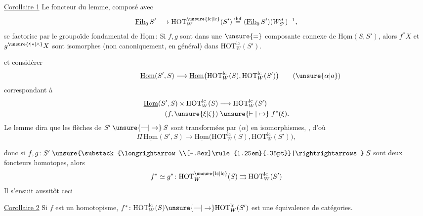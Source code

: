 \uline{Corollaire 1} Le foncteur du lemme, composé avec
\[
\underline{\mathrm{Fib}}_0\,S'\longrightarrow\mathrm{HOT}_W^{\unsure{\mathrm{lc}|\mathrm{le}}}(S')
\overset{\mathrm{def}}{=}(\underline{\mathrm{Fib}}_0\,S')(W_{S'}^d)^{-1},
\]
se factorise par le groupoïde fondamental de $\underline{\mathrm{Hom}}$\,:
Si $f,g$ sont dans une $\unsure{=}$ composante connexe de $\underline{\mathrm{Hom}}(S,S')$, alors $f^*X$ et $g^{\unsure{\prime|*|\wedge}}X$ sont isomorphes  (non canoniquement, en général) dans $\mathrm{HOT}_W^{\mathrm{lc}}(S')$.

  et  considérer
\[
\underline{\mathrm{Hom}}(S',S)\longrightarrow\underline{\mathrm{Hom}}\bigl(\mathrm{HOT}_W^{\mathrm{lc}}(S),\mathrm{HOT}_W^{\mathrm{lc}}(S')\bigr)\tag*{\makebox[0pt][r]{\makebox[\displaywidth][l]{($\unsure{\alpha|a}$)}}}
\]
correspondant à
\[
\begin{aligned}
\underline{\mathrm{Hom}}(S',S)\times\mathrm{HOT}_W^{\mathrm{lc}}(S)&\longrightarrow\mathrm{HOT}_W^{\mathrm{lc}}(S')\\
(f,\unsure{\xi|\zeta})&\mathrel{\unsure{\vdash|\mapsto}}f^*(\xi).
\end{aligned}
\]
Le lemme dira que les flèches de $S'\mathbin{\unsure{\text{---}|\to}}S$ sont transformées par ($\alpha$) en isomorphismes, , d'où
\[
\Pi\,\underline{\mathrm{Hom}}(S',S)\longrightarrow\underline{\mathrm{Hom}}\bigl(\mathrm{HOT}_W^{\mathrm{lc}}(S),\mathrm{HOT}_W^{\mathrm{lc}}(S')\bigr),
\]


donc si $f,g\colon S'\mathrel{\unsure{\substack{\longrightarrow\\[-.8ex]\rule{1.25em}{.35pt}}|\rightrightarrows}}S$ sont deux foncteurs homotopes, alors
\[ f^*\simeq g^*\colon \mathrm{HOT}^{\unsure{\mathrm{lc}|\mathrm{le}}}_W(S)\rightrightarrows\mathrm{HOT}^{\mathrm{lc}}_W(S') \]
Il s'ensuit aussitôt ceci

\uline{Corollaire 2} Si $f$ est un homotopisme, $f^*\colon\mathrm{HOT}^{\mathrm{lc}}_W(S)\unsure{\text{---}|\to}\mathrm{HOT}^{\mathrm{lc}}_W(S')$ est une équivalence de catégories.


